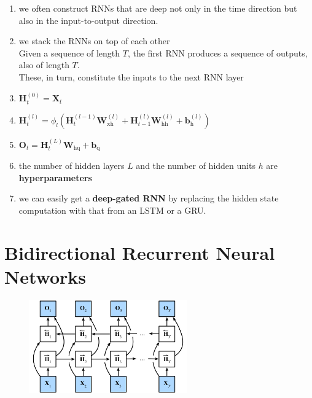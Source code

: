 \begin{enumerate}[itemsep=0.15cm]
    \item we often construct RNNs that are deep not only in the time direction but also in the input-to-output direction.

    \item we stack the RNNs on top of each other\\
    Given a sequence of length $T$, the first RNN produces a sequence of outputs, also of length $T$.\\
    These, in turn, constitute the inputs to the next RNN layer

    \item $\mathbf{H}_t^{(0)} = \mathbf{X}_t$

    \item $\mathbf{H}_t^{(l)} = \phi_l(\mathbf{H}_t^{(l-1)} \mathbf{W}_{\textrm{xh}}^{(l)} + \mathbf{H}_{t-1}^{(l)} \mathbf{W}_{\textrm{hh}}^{(l)}  + \mathbf{b}_\textrm{h}^{(l)})$

    \item $\mathbf{O}_t = \mathbf{H}_t^{(L)} \mathbf{W}_{\textrm{hq}} + \mathbf{b}_\textrm{q}$

    \item the number of hidden layers $L$ and the number of hidden units $h$ are \textbf{hyperparameters}

    \item we can easily get a \textbf{deep-gated RNN} by replacing the hidden state computation with that from an LSTM or a GRU.

    
\end{enumerate}





\section{Bidirectional Recurrent Neural Networks \cite{dnn-1}} \label{Bidirectional Recurrent Neural Networks}

\begin{figure}[H]
    \centering
    \includegraphics[width=\linewidth, height=4cm, keepaspectratio]{Pictures/Recurrent-Neural-Networks/bidir-rnn.jpg}
\end{figure}


